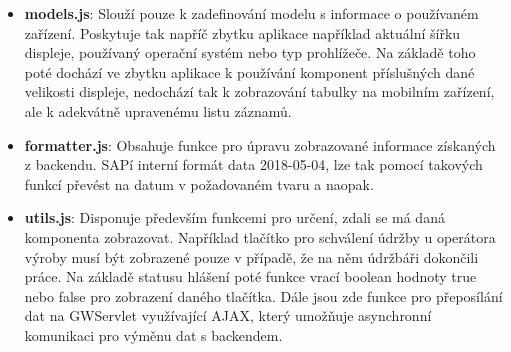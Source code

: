 \documentclass[thesis=M,czech]{FITthesis}[2012/06/26]
\begin{document}
\begin{itemize}
	\begin{itemize}
		\item
		\textbf{models.js}: Slouží pouze k zadefinování modelu s informace o používaném zařízení. Poskytuje tak napříč zbytku aplikace například aktuální šířku displeje, používaný operační systém nebo typ prohlížeče. Na základě toho poté dochází ve zbytku aplikace k používání komponent příslušných dané velikosti displeje, nedochází tak k zobrazování tabulky na mobilním zařízení, ale k adekvátně upravenému listu záznamů.
		\item
		\textbf{formatter.js}: Obsahuje funkce pro úpravu zobrazované informace získaných z backendu. SAPí interní formát data 2018-05-04, lze tak pomocí takových funkcí převést na datum v požadovaném tvaru a naopak.
		\item
		\textbf{utils.js}: Disponuje především funkcemi pro určení, zdali se má daná komponenta zobrazovat. Například tlačítko pro schválení údržby u operátora výroby musí být zobrazené pouze v případě, že na něm údržbáři dokončili práce. Na základě statusu hlášení poté funkce vrací boolean hodnoty true nebo false pro zobrazení daného tlačítka. Dále jsou zde funkce pro přeposílání dat na GWServlet využívající AJAX, který umožňuje asynchronní komunikaci pro výměnu dat s backendem. 
	\end{itemize} 
\end{itemize} 
\end{document}
